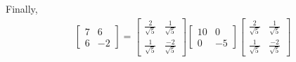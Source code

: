 \documentclass{article}
\begin{document}
Finally,
\begin{equation*}
    \begin{split}
        \begin{bmatrix}
            7 & 6 \\ 6 & -2
        \end{bmatrix} =  \begin{bmatrix}
            \frac{2}{\sqrt{5}} & \frac{1}{\sqrt{5}} \\ \frac{1}{\sqrt{5}} & \frac{-2}{\sqrt{5}}
        \end{bmatrix}\begin{bmatrix}
            10 & 0 \\ 0 & -5 
        \end{bmatrix} \begin{bmatrix}
            \frac{2}{\sqrt{5}} & \frac{1}{\sqrt{5}} \\ \frac{1}{\sqrt{5}} & \frac{-2}{\sqrt{5}}
        \end{bmatrix}
    \end{split}
\end{equation*}
\end{document}

